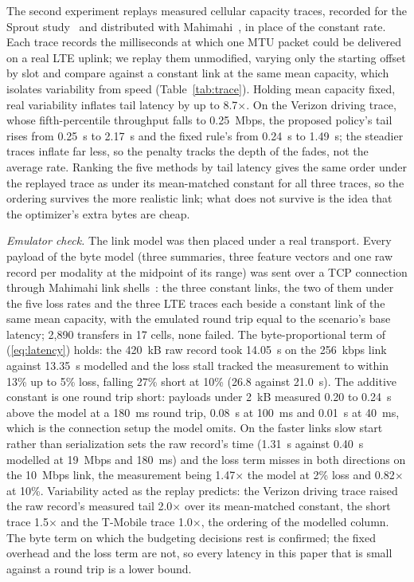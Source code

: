 \documentclass[conference,a4paper]{IEEEtran}
\newif\ifsubmission
\newcommand{\mtab}[2]{\ifsubmission#2\else Table~\ref{#1}\fi}
\begin{document}
The second experiment replays measured cellular capacity traces, recorded for the Sprout study~\cite{sprout} and distributed with Mahimahi~\cite{mahimahi}, in place of the constant rate. Each trace records the milliseconds at which one MTU packet could be delivered on a real LTE uplink; we replay them unmodified, varying only the starting offset by slot and compare against a constant link at the same mean capacity, which isolates variability from speed (\mtab{tab:trace}{full grid in the package}). Holding mean capacity fixed, real variability inflates tail latency by up to 8.7$\times$. On the Verizon driving trace, whose fifth-percentile throughput falls to 0.25~Mbps, the proposed policy's tail rises from 0.25~s to 2.17~s and the fixed rule's from 0.24~s to 1.49~s; the steadier traces inflate far less, so the penalty tracks the depth of the fades, not the average rate. Ranking the five methods by tail latency gives the same order under the replayed trace as under its mean-matched constant for all three traces, so the ordering survives the more realistic link; what does not survive is the idea that the optimizer's extra bytes are cheap.

\emph{Emulator check.} The link model was then placed under a real transport. Every payload of the byte model (three summaries, three feature vectors and one raw record per modality at the midpoint of its range) was sent over a TCP connection through Mahimahi link shells~\cite{mahimahi}: the three constant links, the two of them under the five loss rates and the three LTE traces each beside a constant link of the same mean capacity, with the emulated round trip equal to the scenario's base latency; 2,890 transfers in 17 cells, none failed. The byte-proportional term of (\ref{eq:latency}) holds: the 420~kB raw record took 14.05~s on the 256~kbps link against 13.35~s modelled and the loss stall tracked the measurement to within 13\% up to 5\% loss, falling 27\% short at 10\% (26.8 against 21.0~s). The additive constant is one round trip short: payloads under 2~kB measured 0.20 to 0.24~s above the model at a 180~ms round trip, 0.08~s at 100~ms and 0.01~s at 40~ms, which is the connection setup the model omits. On the faster links slow start~\cite{rfc5681} rather than serialization sets the raw record's time (1.31~s against 0.40~s modelled at 19~Mbps and 180~ms) and the loss term misses in both directions on the 10~Mbps link, the measurement being 1.47$\times$ the model at 2\% loss and 0.82$\times$ at 10\%. Variability acted as the replay predicts: the Verizon driving trace raised the raw record's measured tail 2.0$\times$ over its mean-matched constant, the short trace 1.5$\times$ and the T-Mobile trace 1.0$\times$, the ordering of the modelled column. The byte term on which the budgeting decisions rest is confirmed; the fixed overhead and the loss term are not, so every latency in this paper that is small against a round trip is a lower bound.
\end{document}
